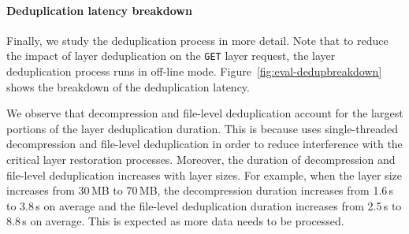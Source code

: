 \paragraph{Deduplication latency breakdown}
%
Finally, we study the deduplication process in more detail.
%
Note that to reduce the impact of layer deduplication on the \texttt{GET} layer request,
the layer deduplication process runs in off-line mode.
%
Figure~\ref{fig:eval-dedupbreakdown} shows the breakdown of the deduplication latency.

We observe that decompression and file-level deduplication account for the largest portions of
the layer deduplication duration.
%
%
This is because \sysname uses single-threaded decompression and file-level deduplication in
order to reduce interference with the critical layer restoration processes.
%
%
Moreover, the duration of decompression and file-level deduplication increases with layer sizes.
%
For example, when the layer size increases from 30\,MB to 70\,MB, 
the decompression duration increases from 1.6\,s to 3.8\,s on average and the file-level deduplication duration increases from 2.5\,s to 8.8\,s on average.
%
This is expected as more data needs to be processed.



